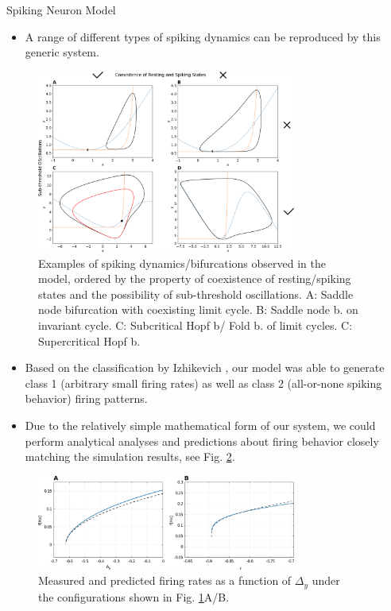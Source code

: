 \documentclass{beamer}
\begin{document}
\begin{frame}[t]
\begin{columns}
\begin{column}{.45\textwidth}
\begin{myblock}{Spiking Neuron Model}
\begin{itemize}
\item A range of different types of spiking dynamics can be reproduced by this generic system.
\end{itemize}
\begin{figure}
\includegraphics[width=0.8\textwidth]{../figures/graphics/bif_types_combined_figure.png}
\caption{Examples of spiking dynamics/bifurcations observed in the model, ordered by the property of coexistence of resting/spiking states and the possibility of sub-threshold oscillations. A: Saddle node bifurcation with coexisting limit cycle. B: Saddle node b. on invariant cycle. C: Subcritical Hopf b/ Fold b. of limit cycles. C: Supercritical Hopf b.}
\label{fig:bif_types_combined}
\end{figure}
\begin{itemize}
\item Based on the classification by Izhikevich \cite{Izhikevich_2007}, our model was able to generate class 1 (arbitrary small firing rates) as well as class 2 (all-or-none spiking behavior) firing patterns.
\item Due to the relatively simple mathematical form of our system, we could perform analytical analyses and predictions about firing behavior closely matching the simulation results, see Fig. \ref{fig:saddle_bif_fir_rates}.
\end{itemize}
\begin{figure}
\includegraphics[width=0.8\textwidth]{../figures/graphics/saddle_bif_fir_rates_combined.png}
\caption{Measured and predicted firing rates as a function of $\Delta_y$ under the configurations shown in Fig. \ref{fig:bif_types_combined}A/B.}
\label{fig:saddle_bif_fir_rates}
\end{figure}
\end{myblock}
\end{column}
\begin{column}{.45\textwidth}


\end{column}
\end{columns}
\end{frame}
\end{document}
